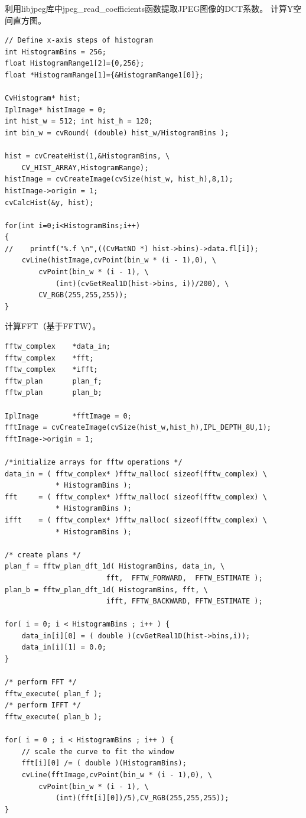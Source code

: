 \documentclass[a4paper, 10pt, notitlepage]{report}
\begin{document}
利用libjpeg库中jpeg\_read\_coefficients函数提取JPEG图像的DCT系数。
计算Y空间直方图。
\begin{lstlisting}[language={[ANSI]C}]
// Define x-axis steps of histogram
int HistogramBins = 256;
float HistogramRange1[2]={0,256};
float *HistogramRange[1]={&HistogramRange1[0]};

CvHistogram* hist;
IplImage* histImage = 0;
int hist_w = 512; int hist_h = 120;
int bin_w = cvRound( (double) hist_w/HistogramBins );

hist = cvCreateHist(1,&HistogramBins, \
    CV_HIST_ARRAY,HistogramRange);
histImage = cvCreateImage(cvSize(hist_w, hist_h),8,1);
histImage->origin = 1;  
cvCalcHist(&y, hist);
   
for(int i=0;i<HistogramBins;i++)
{
//    printf("%.f \n",((CvMatND *) hist->bins)->data.fl[i]);
    cvLine(histImage,cvPoint(bin_w * (i - 1),0), \
        cvPoint(bin_w * (i - 1), \
            (int)(cvGetReal1D(hist->bins, i))/200), \
        CV_RGB(255,255,255));
}
\end{lstlisting}

计算FFT（基于FFTW）。
\begin{lstlisting}[language={[ANSI]C}]
fftw_complex    *data_in;
fftw_complex    *fft;        
fftw_complex    *ifft;    
fftw_plan       plan_f;
fftw_plan       plan_b;

IplImage        *fftImage = 0;
fftImage = cvCreateImage(cvSize(hist_w,hist_h),IPL_DEPTH_8U,1);
fftImage->origin = 1;

/*initialize arrays for fftw operations */
data_in = ( fftw_complex* )fftw_malloc( sizeof(fftw_complex) \
            * HistogramBins );
fft     = ( fftw_complex* )fftw_malloc( sizeof(fftw_complex) \
            * HistogramBins );
ifft    = ( fftw_complex* )fftw_malloc( sizeof(fftw_complex) \
            * HistogramBins );

/* create plans */
plan_f = fftw_plan_dft_1d( HistogramBins, data_in, \
                        fft,  FFTW_FORWARD,  FFTW_ESTIMATE );
plan_b = fftw_plan_dft_1d( HistogramBins, fft, \
                        ifft, FFTW_BACKWARD, FFTW_ESTIMATE );

for( i = 0; i < HistogramBins ; i++ ) {
    data_in[i][0] = ( double )(cvGetReal1D(hist->bins,i));
    data_in[i][1] = 0.0;
}

/* perform FFT */
fftw_execute( plan_f );
/* perform IFFT */
fftw_execute( plan_b );

for( i = 0 ; i < HistogramBins ; i++ ) {
    // scale the curve to fit the window
    fft[i][0] /= ( double )(HistogramBins);
    cvLine(fftImage,cvPoint(bin_w * (i - 1),0), \
        cvPoint(bin_w * (i - 1), \
            (int)(fft[i][0])/5),CV_RGB(255,255,255));
}
\end{lstlisting}
\end{document}
